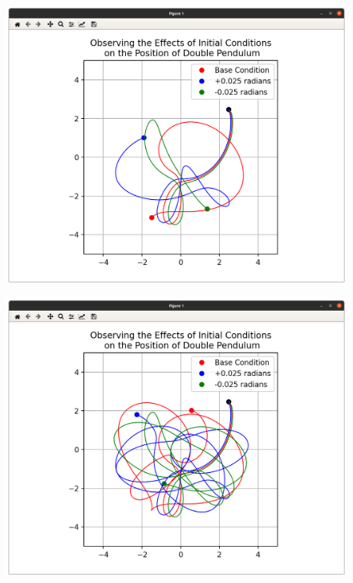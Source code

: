 \documentclass[12 pt]{article}
\begin{document}
\begin{figure}[ht]
  \centering
  \begin{minipage}{.5\textwidth}
    \centering
    \includegraphics[scale=0.18]{chaos1.png}
    \label{fig:chaos1}
  \end{minipage}%
  \begin{minipage}{.5\textwidth}
    \centering
    \includegraphics[scale=0.18]{chaos2.png}
    \label{fig:chaos2}
  \end{minipage}
  \end{figure}
\end{document}
